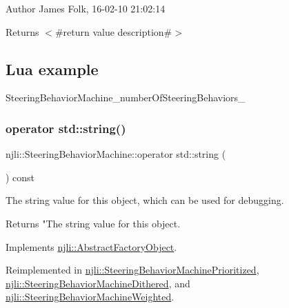 \begin{DoxyAuthor}{Author}
James Folk, 16-\/02-\/10 21\+:02\+:14
\end{DoxyAuthor}
\begin{DoxyReturn}{Returns}
$<$\#return value description\#$>$
\end{DoxyReturn}
\hypertarget{classnjli_1_1_steering_behavior_wander_ex1}{}\subsection{Lua example}\label{classnjli_1_1_steering_behavior_wander_ex1}

\begin{DoxyCodeInclude}
\end{DoxyCodeInclude}
Steering\+Behavior\+Machine\+\_\+number\+Of\+Steering\+Behaviors\+\_\+ \mbox{\label{classnjli_1_1_steering_behavior_machine_a08dc60d265fe55badc0137c1a4427343}} 
\subsubsection{\texorpdfstring{operator std\+::string()}{operator std::string()}}
{\footnotesize\ttfamily njli\+::\+Steering\+Behavior\+Machine\+::operator std\+::string (\begin{DoxyParamCaption}{ }\end{DoxyParamCaption}) const\hspace{0.3cm}{\ttfamily [virtual]}}

The string value for this object, which can be used for debugging.

\begin{DoxyReturn}{Returns}
"The string value for this object. 
\end{DoxyReturn}


Implements \mbox{\hyperlink{classnjli_1_1_abstract_factory_object_a838f4fa7e65cace6098aab5222892942}{njli\+::\+Abstract\+Factory\+Object}}.



Reimplemented in \mbox{\hyperlink{classnjli_1_1_steering_behavior_machine_prioritized_a3268888171ef4efd85513b14616f47a8}{njli\+::\+Steering\+Behavior\+Machine\+Prioritized}}, \mbox{\hyperlink{classnjli_1_1_steering_behavior_machine_dithered_aa23bb3e4de991237c1e5ad172d08ca21}{njli\+::\+Steering\+Behavior\+Machine\+Dithered}}, and \mbox{\hyperlink{classnjli_1_1_steering_behavior_machine_weighted_aa36b0042df33a2e63ec790e5a29ee183}{njli\+::\+Steering\+Behavior\+Machine\+Weighted}}.

